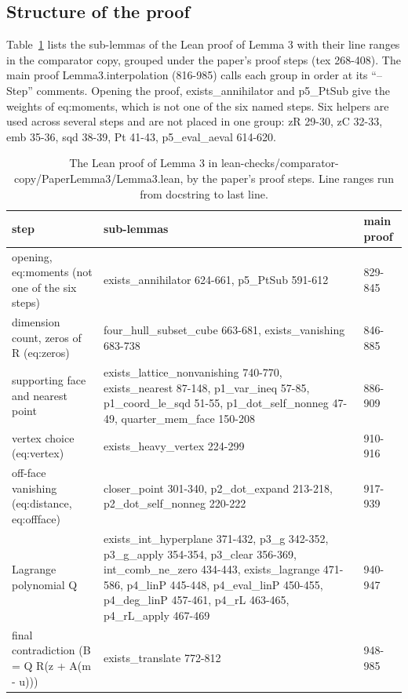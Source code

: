 \subsection{Structure of the proof}

Table~\ref{tab:lemma3-structure} lists the sub-lemmas of the Lean proof of Lemma 3 with their line ranges in the comparator copy, grouped under the paper's proof steps (tex 268-408).
The main proof Lemma3.interpolation (816-985) calls each group in order at its ``-- Step'' comments.
Opening the proof, exists\_annihilator and p5\_PtSub give the weights of eq:moments, which is not one of the six named steps.
Six helpers are used across several steps and are not placed in one group: zR 29-30, zC 32-33, emb 35-36, sqd 38-39, Pt 41-43, p5\_eval\_aeval 614-620.

\begin{table}[tbp]
\caption{The Lean proof of Lemma 3 in lean-checks/\allowbreak comparator-copy/\allowbreak PaperLemma3/\allowbreak Lemma3.lean, by the paper's proof steps. Line ranges run from docstring to last line.}\label{tab:lemma3-structure}
\small
\begin{tabularx}{\textwidth}{@{}>{\raggedright\arraybackslash}p{3.3cm}>{\raggedright\arraybackslash}X l@{}}
\toprule
step & sub-lemmas & main proof \\
\midrule
opening, eq:moments (not one of the six steps) & exists\_annihilator 624-661, p5\_PtSub 591-612 & 829-845 \\
dimension count, zeros of R (eq:zeros) & four\_hull\_subset\_cube 663-681, exists\_vanishing 683-738 & 846-885 \\
supporting face and nearest point & exists\_lattice\_nonvanishing 740-770, exists\_nearest 87-148, p1\_var\_ineq 57-85, p1\_coord\_le\_sqd 51-55, p1\_dot\_self\_nonneg 47-49, quarter\_mem\_face 150-208 & 886-909 \\
vertex choice (eq:vertex) & exists\_heavy\_vertex 224-299 & 910-916 \\
off-face vanishing (eq:distance, eq:offface) & closer\_point 301-340, p2\_dot\_expand 213-218, p2\_dot\_self\_nonneg 220-222 & 917-939 \\
Lagrange polynomial Q & exists\_int\_hyperplane 371-432, p3\_g 342-352, p3\_g\_apply 354-354, p3\_clear 356-369, int\_comb\_ne\_zero 434-443, exists\_lagrange 471-586, p4\_linP 445-448, p4\_eval\_linP 450-455, p4\_deg\_linP 457-461, p4\_rL 463-465, p4\_rL\_apply 467-469 & 940-947 \\
final contradiction (B = Q R(z + A(m - u))) & exists\_translate 772-812 & 948-985 \\
\bottomrule
\end{tabularx}
\end{table}

